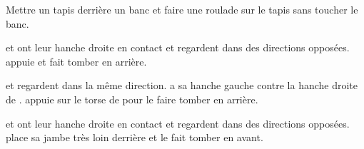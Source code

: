\begin{exercice}

	
	Mettre un tapis derrière un banc et faire une roulade sur le tapis sans toucher le banc.
\end{exercice}


\begin{exercice}
	\label{dep:def:projection-arrière}
	
	
	\A et \D ont leur hanche droite en contact et regardent dans des directions opposées.
	\A appuie et fait tomber \D en arrière.

\end{exercice}


\begin{exercice}

	
	\A et \D regardent dans la même direction.
	\A a sa hanche gauche contre la hanche droite de \D.
	\A appuie sur le torse de \D pour le faire tomber en arrière.

\end{exercice}


\begin{exercice}

	
	\A et \D ont leur hanche droite en contact et regardent dans des directions opposées.
	\A place sa jambe très loin derrière \D et le fait tomber en avant.

\end{exercice}


